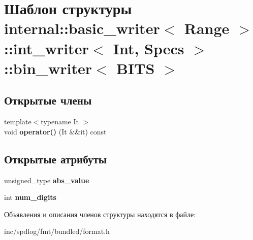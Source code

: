\hypertarget{structinternal_1_1basic__writer_1_1int__writer_1_1bin__writer}{}\section{Шаблон структуры internal\+:\+:basic\+\_\+writer$<$ Range $>$\+:\+:int\+\_\+writer$<$ Int, Specs $>$\+:\+:bin\+\_\+writer$<$ B\+I\+TS $>$}
\label{structinternal_1_1basic__writer_1_1int__writer_1_1bin__writer}
\subsection*{Открытые члены}
\begin{DoxyCompactItemize}
\item 
\mbox{\label{structinternal_1_1basic__writer_1_1int__writer_1_1bin__writer_a59cf1bca49255f106bda6f153627c7fc}} 
{\footnotesize template$<$typename It $>$ }\\void {\bfseries operator()} (It \&\&it) const
\end{DoxyCompactItemize}
\subsection*{Открытые атрибуты}
\begin{DoxyCompactItemize}
\item 
\mbox{\label{structinternal_1_1basic__writer_1_1int__writer_1_1bin__writer_a9f577239025066f81623b83f405bb282}} 
unsigned\+\_\+type {\bfseries abs\+\_\+value}
\item 
\mbox{\label{structinternal_1_1basic__writer_1_1int__writer_1_1bin__writer_acc1bae8a346a0a3562e4a6fb42585f21}} 
int {\bfseries num\+\_\+digits}
\end{DoxyCompactItemize}


Объявления и описания членов структуры находятся в файле\+:\begin{DoxyCompactItemize}
\item 
inc/spdlog/fmt/bundled/format.\+h\end{DoxyCompactItemize}
